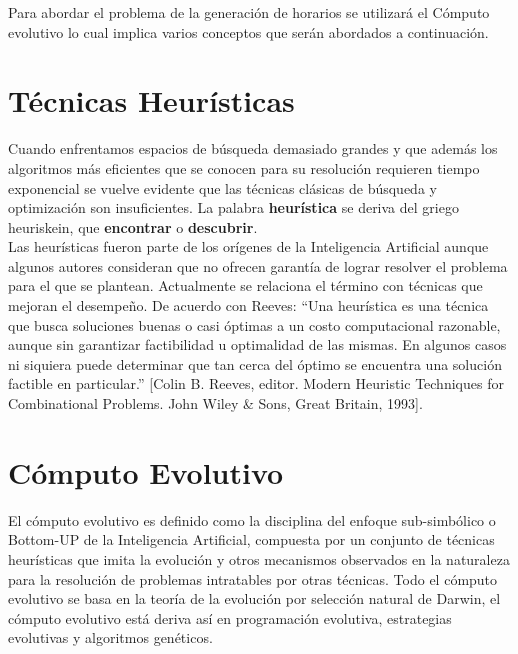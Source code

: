 \label{sec:marcoTeo}
	
	Para abordar el problema de la generación de horarios se utilizará el Cómputo evolutivo lo cual implica varios conceptos que serán abordados a continuación.\\

	\section{Técnicas Heurísticas}
	
		Cuando enfrentamos espacios de búsqueda demasiado grandes y que además los algoritmos más eficientes que se conocen para su resolución requieren tiempo exponencial se vuelve evidente que las técnicas clásicas de búsqueda y optimización son insuficientes. La palabra \textbf{heurística} se deriva del griego heuriskein, que \textbf{encontrar} o \textbf{descubrir}. \\
		
		Las heurísticas fueron parte de los orígenes de la Inteligencia Artificial aunque algunos autores consideran que no ofrecen garantía de lograr resolver el problema para el que se plantean. Actualmente se relaciona el término con técnicas que mejoran el desempeño. De acuerdo con Reeves: “Una heurística es una técnica que busca soluciones buenas o casi óptimas a un costo computacional razonable, aunque sin garantizar factibilidad u optimalidad de las mismas. En algunos casos ni siquiera puede determinar que tan cerca del óptimo se encuentra una solución factible en particular.” [Colin B. Reeves, editor. Modern Heuristic Techniques for Combinational Problems. John Wiley \& Sons, Great Britain, 1993].\\

	\section{Cómputo Evolutivo}
		
		El cómputo evolutivo es definido como la disciplina del enfoque sub-simbólico o Bottom-UP de la Inteligencia Artificial, compuesta por un conjunto de técnicas heurísticas que imita la evolución y otros mecanismos observados en la naturaleza para la resolución de problemas intratables por otras técnicas. Todo el cómputo evolutivo se basa en la teoría de la evolución por selección natural de Darwin, el cómputo evolutivo está deriva así en programación evolutiva, estrategias evolutivas y algoritmos genéticos.\\

